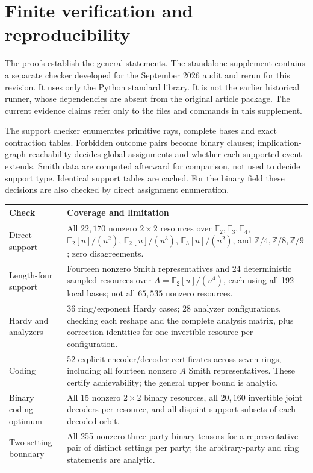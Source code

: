 \documentclass[11pt]{article}
\theoremstyle{definition}\newtheorem{definition}[theorem]{Definition}
\theoremstyle{remark}\newtheorem{remark}[theorem]{Remark}
\newcommand{\F}{\mathbb F}
\newcommand{\A}{\F_2[u]/(u^4)}
\begin{document}
\section{Finite verification and reproducibility}\label{sec:verification}
The proofs establish the general statements. The standalone supplement contains a separate checker developed for the September 2026 audit and rerun for this revision. It uses only the Python standard library. It is not the earlier historical runner, whose dependencies are absent from the original article package. The current evidence claims refer only to the files and commands in this supplement.

The support checker enumerates primitive rays, complete bases and exact contraction tables. Forbidden outcome pairs become binary clauses; implication-graph reachability decides global assignments and whether each supported event extends. Smith data are computed afterward for comparison, not used to decide support type. Identical support tables are cached. For the binary field these decisions are also checked by direct assignment enumeration.

\begin{center}\small
\begin{tabular}{p{.27\linewidth}p{.61\linewidth}}
\toprule
Check & Coverage and limitation\\\midrule
Direct support & All $22{,}170$ nonzero $2\times2$ resources over $\F_2,\F_3,\F_4$, $\F_2[u]/(u^2)$, $\F_2[u]/(u^3)$, $\F_3[u]/(u^2)$, and $\mathbb Z/4,\mathbb Z/8,\mathbb Z/9$; zero disagreements.\\[3pt]
Length-four support & Fourteen nonzero Smith representatives and 24 deterministic sampled resources over $A=\A$, each using all 192 local bases; not all $65{,}535$ nonzero resources.\\[3pt]
Hardy and analyzers & 36 ring/exponent Hardy cases; 28 analyzer configurations, checking each reshape and the complete analysis matrix, plus correction identities for one invertible resource per configuration.\\[3pt]
Coding & 52 explicit encoder/decoder certificates across seven rings, including all fourteen nonzero $A$ Smith representatives. These certify achievability; the general upper bound is analytic.\\[3pt]
Binary coding optimum & All 15 nonzero $2\times2$ binary resources, all $20{,}160$ invertible joint decoders per resource, and all disjoint-support subsets of each decoded orbit.\\[3pt]
Two-setting boundary & All 255 nonzero three-party binary tensors for a representative pair of distinct settings per party; the arbitrary-party and ring statements are analytic.\\\bottomrule
\end{tabular}
\end{center}
\end{document}
